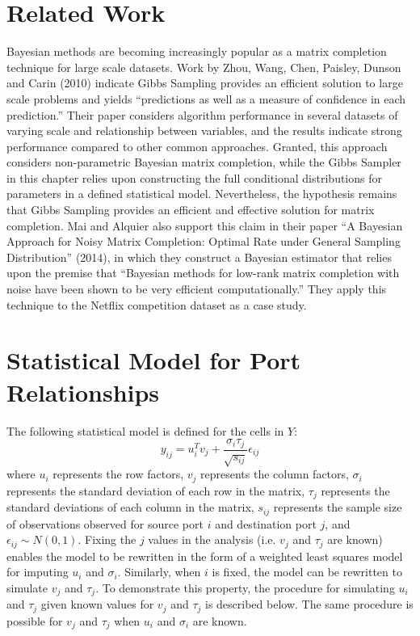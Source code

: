 \documentclass[12pt,twoside]{dukestatscithesis}
\theoremstyle{definition}
\theoremstyle{definition}
\theoremstyle{definition}
\theoremstyle{remark}
\begin{document}
\section{Related Work}\label{related-work-1}

Bayesian methods are becoming increasingly popular as a matrix
completion technique for large scale datasets. Work by Zhou, Wang, Chen,
Paisley, Dunson and Carin (2010) indicate Gibbs Sampling provides an
efficient solution to large scale problems and yields ``predictions as
well as a measure of confidence in each prediction.'' Their paper
considers algorithm performance in several datasets of varying scale and
relationship between variables, and the results indicate strong
performance compared to other common approaches. Granted, this approach
considers non-parametric Bayesian matrix completion, while the Gibbs
Sampler in this chapter relies upon constructing the full conditional
distributions for parameters in a defined statistical model.
Nevertheless, the hypothesis remains that Gibbs Sampling provides an
efficient and effective solution for matrix completion. Mai and Alquier
also support this claim in their paper ``A Bayesian Approach for Noisy
Matrix Completion: Optimal Rate under General Sampling Distribution''
(2014), in which they construct a Bayesian estimator that relies upon
the premise that ``Bayesian methods for low-rank matrix completion with
noise have been shown to be very efficient computationally.'' They apply
this technique to the Netflix competition dataset as a case study.

\section{Statistical Model for Port
Relationships}\label{statistical-model-for-port-relationships}

The following statistical model is defined for the cells in \(Y\):
\[y_{ij} = u_i^Tv_j + \frac{\sigma_i \tau_j}{\sqrt{s_{ij}}}\epsilon_{ij}\]
where \(u_i\) represents the row factors, \(v_j\) represents the column
factors, \(\sigma_i\) represents the standard deviation of each row in
the matrix, \(\tau_j\) represents the standard deviations of each column
in the matrix, \(s_{ij}\) represents the sample size of observations
observed for source port \(i\) and destination port \(j\), and
\(\epsilon_{ij} \sim N(0,1)\). Fixing the \(j\) values in the analysis
(i.e. \(v_j\) and \(\tau_j\) are known) enables the model to be
rewritten in the form of a weighted least squares model for imputing
\(u_i\) and \(\sigma_i\). Similarly, when \(i\) is fixed, the model can
be rewritten to simulate \(v_j\) and \(\tau_j\). To demonstrate this
property, the procedure for simulating \(u_i\) and \(\tau_j\) given
known values for \(v_j\) and \(\tau_j\) is described below. The same
procedure is possible for \(v_j\) and \(\tau_j\) when \(u_i\) and
\(\sigma_i\) are known.
\end{document}
